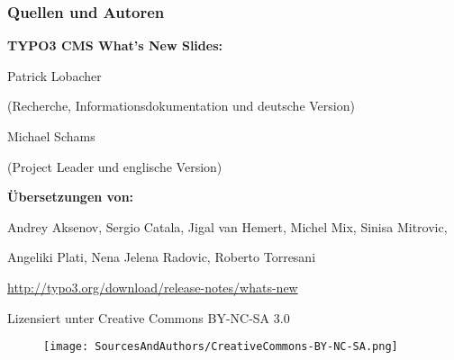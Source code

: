 \begin{frame}[fragile]
	\frametitle{Quellen und Autoren}

	\vspace{-0.6cm}

	\centerline{\textbf{TYPO3 CMS What's New Slides:}}

	\begin{center}
		\smaller
			\centerline{Patrick Lobacher}
			\centerline{(Recherche, Informationsdokumentation und deutsche Version)}
			\vspace{0.1cm}
			\centerline{Michael Schams}
			\centerline{(Project Leader und englische Version)}
		\normalsize
	\end{center}
	\vspace{-0.6cm}
	\begin{center}
		\smaller
			\centerline{\textbf{Übersetzungen von:}}
			\centerline{Andrey Aksenov, Sergio Catala, Jigal van Hemert, Michel Mix, Sinisa Mitrovic,}
			\centerline{Angeliki Plati, Nena Jelena Radovic, Roberto Torresani}
		\normalsize
	\end{center}
	\vspace{-0.6cm}
	\smaller\begin{center}\url{http://typo3.org/download/release-notes/whats-new}\end{center}\normalsize

	\smaller\begin{center}Lizensiert unter Creative Commons BY-NC-SA 3.0\end{center}\normalsize
	\begin{figure}\vspace*{-0.3cm}
		\texttt{[image: SourcesAndAuthors/CreativeCommons-BY-NC-SA.png]}
	\end{figure}

\end{frame}

